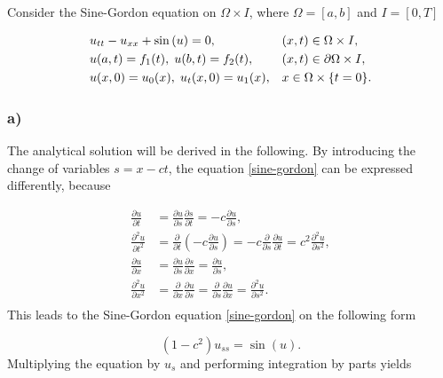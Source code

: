 Consider the Sine-Gordon equation on $\Omega \times I$, where $\Omega = [a,b]$ and $I = [0, T]$

\begin{align}
    &u_{tt} - u_{xx} + \sin{(u)} = 0, &&(x,t) \in \Omega \times I, \label{sine-gordon} \\
    &u(a,t) = f_1(t), \hspace{1mm} u(b,t) = f_2(t),  &&(x,t) \in \partial\Omega \times I,\label{sine-gordon-BC} \\
    &u(x,0) = u_0(x), \hspace{1mm} u_t(x,0) = u_1(x), &&x \in \Omega \times \{t=0\}. \label{sine-gordon-IC}
\end{align}

\subsubsection*{a)}

The analytical solution will be derived in the following. By introducing the change of variables $s = x - ct$, the equation \eqref{sine-gordon} can be expressed differently, because

\begin{equation*}
\begin{split}
    \frac{\partial u}{\partial t} &= \frac{\partial u}{\partial s}\frac{\partial s}{\partial t} = -c\frac{\partial u}{\partial s}, \\
    \frac{\partial^2 u}{\partial t^2} &= \frac{\partial }{\partial t}\left(-c\frac{\partial u}{\partial s}\right) = -c \frac{\partial }{\partial s}\frac{\partial u}{\partial t} = c^2 \frac{\partial^2 u}{\partial s^2}, \\
    \frac{\partial u}{\partial x} &= \frac{\partial u}{\partial s}\frac{\partial s}{\partial x} = \frac{\partial u}{\partial s}, \\
    \frac{\partial^2 u}{\partial x^2} &= \frac{\partial }{\partial x}\frac{\partial u}{\partial s} = \frac{\partial }{\partial s}\frac{\partial u}{\partial x} = \frac{\partial^2 u}{\partial s^2}. \\
\end{split}
\end{equation*}
This leads to the Sine-Gordon equation \eqref{sine-gordon} on the following form

\begin{equation*}
    \left(1-c^2\right)u_{ss} = \sin{(u)}.
\end{equation*}
Multiplying the equation by $u_s$ and performing integration by parts yields

